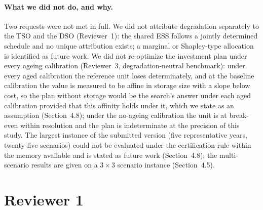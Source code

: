 \documentclass[11pt]{article}
\begin{document}
\paragraph{What we did not do, and why.}
Two requests were not met in full. We did not attribute degradation separately to the TSO and the DSO (Reviewer~1): the shared ESS follows a jointly determined schedule and no unique attribution exists; a marginal or Shapley-type allocation is identified as future work. We did not re-optimize the investment plan under every ageing calibration (Reviewer~3, degradation-neutral benchmark): under every aged calibration the reference unit loses determinately, and at the baseline calibration the value is measured to be affine in storage size with a slope below cost, so the plan without storage would be the search's answer under each aged calibration provided that this affinity holds under it, which we state as an assumption (Section~4.8); under the no-ageing calibration the unit is at break-even within resolution and the plan is indeterminate at the precision of this study. The largest instance of the submitted version (five representative years, twenty-five scenarios) could not be evaluated under the certification rule within the memory available and is stated as future work (Section~4.8); the multi-scenario results are given on a $3\times3$ scenario instance (Section~4.5).

\section*{Reviewer 1}
\end{document}
